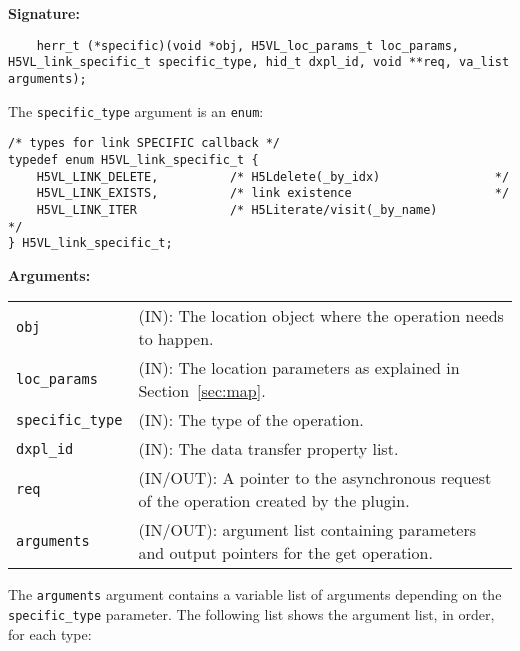 \begin{mdframed}[style=bgbox]
\textbf{Signature:}
\begin{lstlisting}
	herr_t (*specific)(void *obj, H5VL_loc_params_t loc_params, H5VL_link_specific_t specific_type, hid_t dxpl_id, void **req, va_list arguments);
\end{lstlisting}

The \texttt{specific\_type} argument is an \texttt{enum}:
\begin{lstlisting}
/* types for link SPECIFIC callback */
typedef enum H5VL_link_specific_t {
    H5VL_LINK_DELETE,          /* H5Ldelete(_by_idx)                */
    H5VL_LINK_EXISTS,          /* link existence                    */
    H5VL_LINK_ITER             /* H5Literate/visit(_by_name)              */
} H5VL_link_specific_t;
\end{lstlisting}

\textbf{Arguments:}\\
\begin{tabular}{l p{13.5cm}}
  \texttt{obj} & (IN): The location object  where the operation needs to happen.\\
  \texttt{loc\_params} & (IN): The location parameters as explained in Section~\ref{sec:map}.\\
  \texttt{specific\_type} & (IN): The type of the operation.\\
  \texttt{dxpl\_id} & (IN): The data transfer property list.\\
  \texttt{req} & (IN/OUT): A pointer to the asynchronous request of the
  operation created by the plugin.\\
  \texttt{arguments} & (IN/OUT): argument list containing parameters and
  output pointers for the get operation. \\
\end{tabular}
\end{mdframed}

The \texttt{arguments} argument contains a variable list of arguments
depending on the \texttt{specific\_type} parameter. The following list shows
the argument list, in order, for each type:

